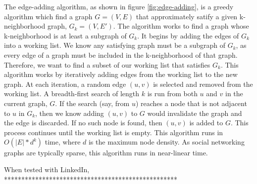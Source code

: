 \indent The edge-adding algorithm, as shown in figure \ref{fig:edge-adding}, is a greedy algorithm which find a graph $G = (V,E)$ that approximately satify a given k-neighborhood graph, $G_k = (V, E')$. The algorithm works to find a graph whose k-neighborhood is at least a subgraph of $G_k$. It begins by adding the edges of $G_k$ into a working list. We know any satisfying graph must be a subgraph of $G_k$, as every edge of a graph must be included in the k-neighborhood of that graph. Therefore, we want to find a subset of our working list that satisfies $G_k$. This algorithm works by iteratively adding edges from the working list to the new graph.  At each iteration, a random edge $(u,v)$ is selected and removed from the working list. A breadth-first search of length $k$ is run from both $u$ and $v$ in the current graph, $G$. If the search (say, from $u$) reaches a node that is not adjacent to $u$ in $G_k$, then we know adding $(u,v)$ to $G$ would invalidate the graph and the edge is discarded. If no such node is found, then $(u,v)$ is added to $G$. This process continues until the working list is empty. This algorithm runs in $O(|E|*d^k)$ time, where $d$ is the maximum node density. As social networking graphs are typically sparse, this algorithm runs in near-linear time.

\indent When tested with LinkedIn, **************************************************
